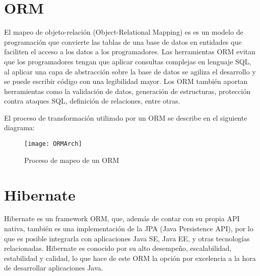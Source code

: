\section{ORM}
El mapeo de objeto-relación (Object-Relational Mapping) es es un modelo de programación que convierte las tablas de una base de datos en entidades que faciliten el acceso a los datos a los programadores.
Las herramientas ORM evitan que los programadores tengan que aplicar consultas complejas en lenguaje SQL, al aplicar una capa de abstracción sobre la base de datos se agiliza el desarrollo y se puede escribir código con una legibilidad mayor.
Los ORM también aportan herramientas como la validación de datos, generación de estructuras, protección contra ataques SQL, definición de relaciones, entre otras.

El proceso de transformación utilizado por un ORM se describe en el siguiente diagrama:

\begin{figure}[H]
  \begin{center}
    \texttt{[image: ORMArch]}
  \end{center}
  \caption{Proceso de mapeo de un ORM}
\end{figure}

\section{Hibernate}
Hibernate es un framework ORM, que, además de contar con su propia API nativa, también es una implementación de la JPA (Java Persistence API), por lo que es posible integrarla con aplicaciones Java SE, Java EE, y otras tecnologías relacionadas.
Hibernate es conocido por su alto desempeño, escalabilidad, estabilidad y calidad, lo que hace de este ORM la opción por excelencia a la hora de desarrollar aplicaciones Java. 
